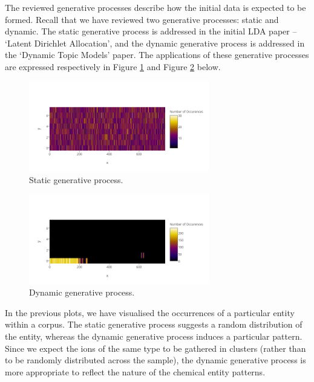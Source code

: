 \documentclass{mprop}
\begin{document}
\par The reviewed generative processes describe how the initial data is expected to be formed. Recall that we have reviewed two generative processes: static and dynamic. The static generative process is addressed in the initial LDA paper -- `Latent Dirichlet Allocation', and the dynamic generative process is addressed in the `Dynamic Topic Models' paper. The applications of these generative processes are expressed respectively in Figure \ref{fig:static} and Figure \ref{fig:dynamic} below. 
\begin{figure}[H]
  \centering
  \includegraphics[width=0.7\textwidth]{static}
  \caption{Static generative process.}
  \label{fig:static}
\end{figure}
\begin{figure}[H]
  \centering
  \includegraphics[width=0.7\textwidth]{dynamic}
  \caption{Dynamic generative process.}
  \label{fig:dynamic}
\end{figure}
In the previous plots, we have visualised the occurrences of a particular entity within a corpus. The static generative process suggests a random distribution of the entity, whereas the dynamic generative process induces a particular pattern. Since we expect the ions of the same type to be gathered in clusters (rather than to be randomly distributed across the sample), the dynamic generative process is more appropriate to reflect the nature of the chemical entity patterns.  

\end{document}
